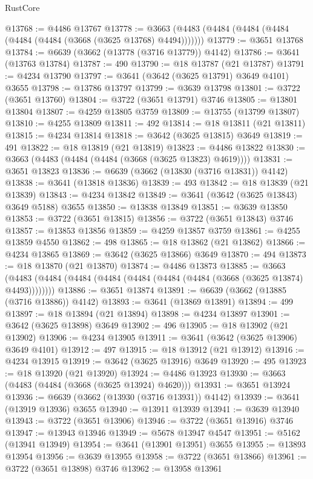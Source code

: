 \begin{lexlean}{RustCore}
\begin{coremodule}
@13768 := @4486 @13767
@13778 := @3663 (@4483 (@4484 (@4484 (@4484 (@4484 (@4484 (@3668 (@3625 @13768) @4494)))))))
@13779 := @3651 @13768
@13784 := @6639 (@3662 (@13778 (@3716 @13779)) @4142)
@13786 := @3641 (@13763 @13784)
@13787 := 490
@13790 := @18 @13787 (@21 @13787)
@13791 := @4234 @13790
@13797 := @3641 (@3642 (@3625 @13791) @3649 @4101) @3655
@13798 := @13786 @13797
@13799 := @3639 @13798
@13801 := @3722 (@3651 @13760)
@13804 := @3722 (@3651 @13791) @3746
@13805 := @13801 @13804
@13807 := @4259 @13805 @3759
@13809 := @13755 (@13799 @13807)
@13810 := @4255 @13809
@13811 := 492
@13814 := @18 @13811 (@21 @13811)
@13815 := @4234 @13814
@13818 := @3642 (@3625 @13815) @3649
@13819 := 491
@13822 := @18 @13819 (@21 @13819)
@13823 := @4486 @13822
@13830 := @3663 (@4483 (@4484 (@4484 (@3668 (@3625 @13823) @4619))))
@13831 := @3651 @13823
@13836 := @6639 (@3662 (@13830 (@3716 @13831)) @4142)
@13838 := @3641 (@13818 @13836)
@13839 := 493
@13842 := @18 @13839 (@21 @13839)
@13843 := @4234 @13842
@13849 := @3641 (@3642 (@3625 @13843) @3649 @5188) @3655
@13850 := @13838 @13849
@13851 := @3639 @13850
@13853 := @3722 (@3651 @13815)
@13856 := @3722 (@3651 @13843) @3746
@13857 := @13853 @13856
@13859 := @4259 @13857 @3759
@13861 := @4255 @13859 @4550
@13862 := 498
@13865 := @18 @13862 (@21 @13862)
@13866 := @4234 @13865
@13869 := @3642 (@3625 @13866) @3649
@13870 := 494
@13873 := @18 @13870 (@21 @13870)
@13874 := @4486 @13873
@13885 := @3663 (@4483 (@4484 (@4484 (@4484 (@4484 (@4484 (@4484 (@3668 (@3625 @13874) @4493))))))))
@13886 := @3651 @13874
@13891 := @6639 (@3662 (@13885 (@3716 @13886)) @4142)
@13893 := @3641 (@13869 @13891)
@13894 := 499
@13897 := @18 @13894 (@21 @13894)
@13898 := @4234 @13897
@13901 := @3642 (@3625 @13898) @3649
@13902 := 496
@13905 := @18 @13902 (@21 @13902)
@13906 := @4234 @13905
@13911 := @3641 (@3642 (@3625 @13906) @3649 @4101)
@13912 := 497
@13915 := @18 @13912 (@21 @13912)
@13916 := @4234 @13915
@13919 := @3642 (@3625 @13916) @3649
@13920 := 495
@13923 := @18 @13920 (@21 @13920)
@13924 := @4486 @13923
@13930 := @3663 (@4483 (@4484 (@3668 (@3625 @13924) @4620)))
@13931 := @3651 @13924
@13936 := @6639 (@3662 (@13930 (@3716 @13931)) @4142)
@13939 := @3641 (@13919 @13936) @3655
@13940 := @13911 @13939
@13941 := @3639 @13940
@13943 := @3722 (@3651 @13906)
@13946 := @3722 (@3651 @13916) @3746
@13947 := @13943 @13946
@13949 := @5678 @13947 @4547
@13951 := @5162 (@13941 @13949)
@13954 := @3641 (@13901 @13951) @3655
@13955 := @13893 @13954
@13956 := @3639 @13955
@13958 := @3722 (@3651 @13866)
@13961 := @3722 (@3651 @13898) @3746
@13962 := @13958 @13961

\end{coremodule}
\end{lexlean}
